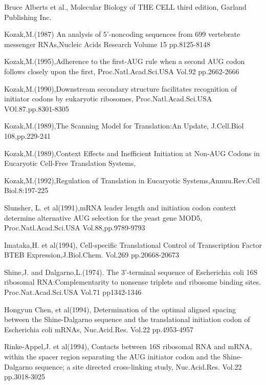 \newpage
\begin{thebibliography}{99}
 Bruce Alberts et al.,
Molecular Biology of THE CELL third edition,
Garland Publishing Inc.

 Kozak,M.(1987) An analysis of 5'-noncoding sequences from
699 vertebrate messenger RNAs,Nucleic Acids Research Volume 15 pp.8125-8148

 Kozak,M.(1995),Adherence to the first-AUG rule when a 
second AUG codon follows closely upon the first,
Proc.Natl.Acad.Sci.USA Vol.92 pp.2662-2666

 Kozak,M.(1990),Downstream secondary structure facilitates
recognition of initiator codons by eukaryotic ribosomes,
Proc.Natl.Acad.Sci.USA VOl.87.pp.8301-8305

 Kozak,M.(1989),The Scanning Model for Translation:An Update,
J.Cell.Biol 108,pp.229-241

 Kozak,M.(1989),Context Effects and Inefficient Initiation
 at Non-AUG Codons in Eucaryotic Cell-Free Translation Systems,

 Kozak,M.(1992),Regulation of Translation in Eucaryotic
Systems,Annuu.Rev.Cell Biol.8:197-225

 Slunsher, L. et al(1991),mRNA leader length and initiation
codon context determine alternative AUG selection for the yeast gene MOD5,
Proc.Natl.Acad.Sci.USA Vol.88,pp.9789-9793


 Imataka,H. et al(1994), Cell-specific Translational Control
of Transcription Factor BTEB Expression,J.Biol.Chem. Vol.269 pp.20668-20673

 Shine,J. and Dalgarno,L.(1974). The 3'-terminal sequence
of Escherichia coli 16S ribosomal RNA:Complementarity to nonsense triplets
and ribosome binding sites. Proc.Nat.Acad.Sci.USA Vol.71 pp1342-1346

 Hongyun Chen, et al(1994),
Determination of the optimal aligned spacing between the Shine-Dalgarno
sequence and the translational initiation codon of Escherichia coli mRNAs,
Nuc.Acid.Res. Vol.22 pp.4953-4957

 Rinke-Appel,J. et al(1994),
 Contacts between 16S ribosomal RNA and
mRNA, within the spacer region separating the AUG initiator codon and the
Shine-Dalgarno sequence; a site directed cross-linking study,
Nuc.Acid.Res. Vol.22 pp.3018-3025


\end{thebibliography}
